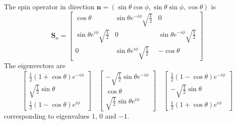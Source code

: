 \documentclass[cyan]{elegantnote}
\begin{document}
The spin operator in direction $\bm{n} = (\sin\theta\cos\phi,\sin\theta\sin\phi,\cos\theta)$ is
\[\bm{S}_{n} =  \left[ \begin{matrix} \cos\theta& \sin\theta e^{-i\phi} \sqrt{\frac{1}{2}}& 0\\ \sin\theta e^{i\phi}\sqrt{\frac{1}{2}}& 0& \sin\theta e^{-i\phi} \sqrt{\frac{1}{2}}\\ 0& \sin\theta e^{i\phi} \sqrt{\frac{1}{2}}& -\cos\theta\end{matrix} \right]\]
The eigenvectors are
\[\left[ \begin{matrix} \frac{1}{2}(1+\cos\theta)e^{-i\phi}\\ \sqrt{\frac{1}{2}}\sin\theta \\ \frac{1}{2}(1-\cos\theta)e^{i\phi} \end{matrix} \right] \quad \left[ \begin{matrix} -\sqrt{\frac{1}{2}}\sin\theta e^{-i\phi}\\ \cos\theta \\ \sqrt{\frac{1}{2}}\sin\theta e^{i\phi} \end{matrix} \right] \quad \left[ \begin{matrix} \frac{1}{2}(1-\cos\theta)e^{-i\phi}\\ -\sqrt{\frac{1}{2}}\sin\theta \\ \frac{1}{2}(1+\cos\theta)e^{i\phi} \end{matrix} \right]\]
corresponding to eigenvalues $1$, $0$ and $-1$.
\end{document}
